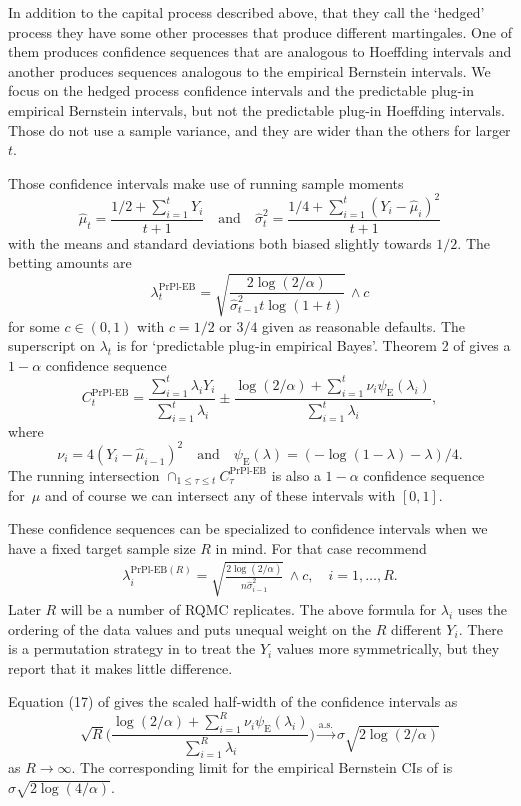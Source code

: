 \documentclass{article}
\newcommand{\art}[1]{\begingroup\color{blue}#1\endgroup}
\renewcommand{\le}{\leqslant}
\newcommand{\toas}{\stackrel{\mathrm{a.s.}}{\to}}
\newcommand{\prpleb}{\text{PrPl-EB}}
\newcommand{\eb}{\mathrm{E}}
\begin{document}
In addition to the capital process described
above, \art{that they call the `hedged' process}
they have some other processes that
produce different martingales. One of them produces confidence
sequences that are analogous to Hoeffding intervals
and another produces sequences analogous to the
empirical Bernstein intervals.  \art{We focus on the 
hedged process confidence intervals and the
predictable plug-in empirical Bernstein
intervals, but not the predictable plug-in Hoeffding intervals. Those
do not use a sample variance, and they are wider than the others for 
larger $t$.}


Those confidence intervals make use of running sample moments
$$
\hat\mu_t = \frac{1/2+\sum_{i=1}^tY_i}{t+1}
\quad\text{and}\quad
\hat\sigma^2_t = \frac{1/4+\sum_{i=1}^t(Y_i-\hat\mu_i)^2}{t+1}
$$
with the means and standard deviations 
both biased slightly towards $1/2$.
The betting amounts are
$$
\lambda_t^\prpleb = \sqrt{\frac{2\log(2/\alpha)}{\hat\sigma^2_{t-1}t\log(1+t)}}\,\wedge c
$$
for some $c\in(0,1)$ with $c=1/2$ or $3/4$
given as reasonable defaults. The superscript on $\lambda_t$ 
is for `predictable plug-in empirical Bayes'.
Theorem 2 of \cite{WauRam24a} 
gives a $1-\alpha$ confidence sequence
$$
C_t^\prpleb = \frac{\sum_{i=1}^t\lambda_iY_i}{\sum_{i=1}^t\lambda_i}
\pm \frac{\log(2/\alpha)+\sum_{i=1}^t\nu_i\psi_{\eb}(\lambda_i)}{\sum_{i=1}^t\lambda_i},
$$
where
$$
\nu_i = 4(Y_i-\hat\mu_{i-1})^2
\quad\text{and}\quad \psi_{\eb}(\lambda)
= (-\log(1-\lambda)-\lambda)/4.
$$
The running intersection
$\cap_{1\le\tau\le t}C^\prpleb_\tau$
is also a $1-\alpha$ confidence sequence for~$\mu$ and
of course we can intersect any of these intervals with $[0,1]$.

These confidence sequences can be specialized to confidence
intervals when we have a fixed target sample size $R$
in mind.  For that case \cite{WauRam24a}
recommend
\begin{align}\label{eq:purplelambda}
\lambda_i^{\prpleb(R)} = \sqrt{\frac{2\log(2/\alpha)}{n\hat\sigma^2_{i-1}}}\,\wedge c,\quad i=1,\dots,R.
\end{align}
Later $R$ will be a number of RQMC replicates.
The above formula for $\lambda_i$ uses the ordering
of the data values and puts unequal weight on the
$R$ different $Y_i$. There is a permutation strategy
in \cite{WauRam24a} to treat the $Y_i$ values more
symmetrically, but they report that it makes little difference.

Equation (17) of \cite{WauRam24a} gives the
scaled half-width of the \prpleb{} confidence intervals as
$$
\sqrt{R}\biggl(\frac{\log(2/\alpha)+\sum_{i=1}^R\nu_i\psi_\eb(\lambda_i)}{\sum_{i=1}^R\lambda_i} \biggr)\toas \sigma\sqrt{2\log(2/\alpha)}
$$
as $R\to\infty$.  The corresponding limit for the empirical
Bernstein CIs of \cite{maurer2009empirical}
is $\sigma\sqrt{2\log(4/\alpha)}$.
\end{document}
